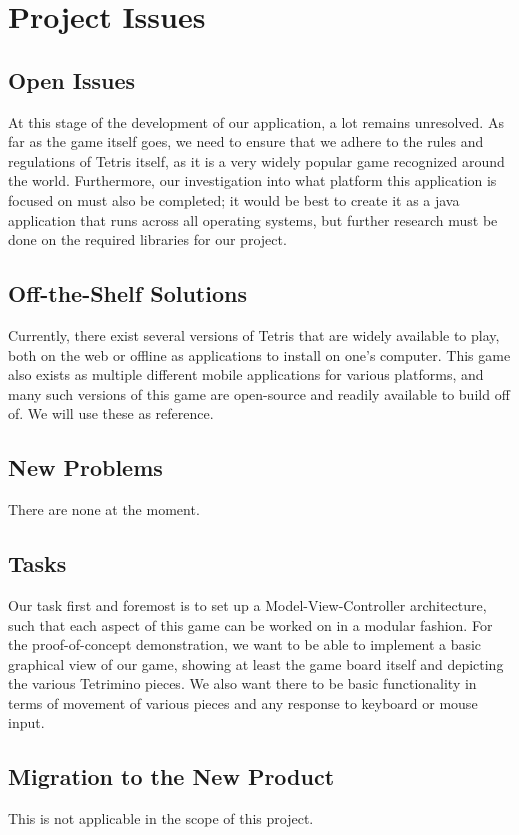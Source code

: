 \documentclass[12pt, titlepage]{article}
\begin{document}
\section{Project Issues}

\subsection{Open Issues}
At this stage of the development of our application, a lot remains unresolved. As far as the game itself goes, we need to ensure that we adhere to the rules and regulations of Tetris itself, as it is a very widely popular game recognized around the world. Furthermore, our investigation into what platform this application is focused on must also be completed; it would be best to create it as a java application that runs across all operating systems, but further research must be done on the required libraries for our project.
\subsection{Off-the-Shelf Solutions}
Currently, there exist several versions of Tetris that are widely available to play, both on the web or offline as applications to install on one's computer. This game also exists as multiple different mobile applications for various platforms, and many such versions of this game are open-source and readily available to build off of. We will use these as reference.


\subsection{New Problems}
There are none at the moment.
\subsection{Tasks}
Our task first and foremost is to set up a Model-View-Controller architecture, such that each aspect of this game can be worked on in a modular fashion. For the proof-of-concept demonstration, we want to be able to implement a basic graphical view of our game, showing at least the game board itself and depicting the various Tetrimino pieces. We also want there to be basic functionality in terms of movement of various pieces and any response to keyboard or mouse input.
\subsection{Migration to the New Product}
This is not applicable in the scope of this project.
\end{document}
